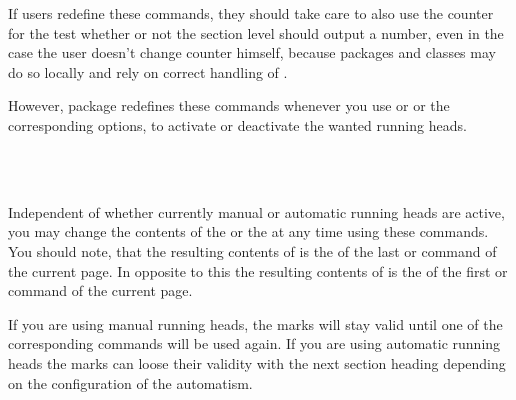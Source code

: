 If users redefine these commands, they should take care
to also use the counter  for the test whether or not the
section level should output a number, even in the case the user
doesn't change counter  himself, because packages and
classes may do so locally and rely on correct handling of
.

However, package  redefines these commands whenever you use
 or  or the corresponding options, to
activate or deactivate the wanted running heads.%
%
%
%
%
%
%
%
%

\begin{Declaration}
  \\
  \\
\end{Declaration}
%
%
%
Independent of whether currently manual or automatic running heads are active,
you may change the contents of the  or the 
at any time using these commands. You should note, that the resulting contents
of  is the  of the last  or  command of the
current page. In opposite to this the resulting contents of
 is the  of the first
 or  command of the current page.

If you are using manual running heads, the marks will stay valid until one of
the corresponding commands will be used again. If you are using automatic
running heads the marks can loose their validity with the next section heading
depending on the configuration of the automatism.

